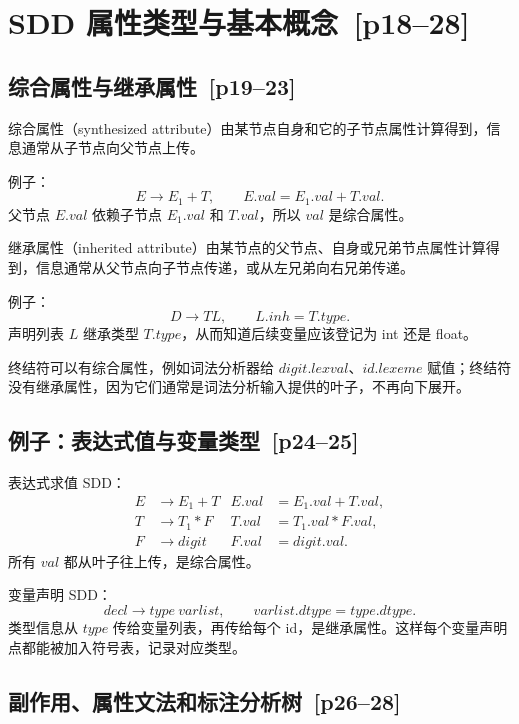 \documentclass[UTF8,fontset=none,11pt]{ctexart}
\newenvironment{defbox}[1][]{%
  \par\medskip\noindent{\color{defrule}\rule{\linewidth}{1.1pt}}\par\nopagebreak
  \noindent{\bfseries\color{defrule}#1}\par\nopagebreak\smallskip}%
  {\par\nopagebreak\smallskip\noindent{\color{defrule}\rule{\linewidth}{0.4pt}}\par\medskip}
\newcommand{\pg}[1]{\texorpdfstring{{\small\color{graytext}\,[p#1]}}{ [p#1]}}
\begin{document}
\section{SDD 属性类型与基本概念 \pg{18--28}}

\subsection{综合属性与继承属性 \pg{19--23}}

\begin{defbox}[综合属性]
综合属性（synthesized attribute）由某节点自身和它的子节点属性计算得到，信息通常从子节点向父节点上传。
\end{defbox}

例子：
\[
E\to E_1+T,\qquad E.val=E_1.val+T.val.
\]
父节点 \(E.val\) 依赖子节点 \(E_1.val\) 和 \(T.val\)，所以 \(val\) 是综合属性。

\begin{defbox}[继承属性]
继承属性（inherited attribute）由某节点的父节点、自身或兄弟节点属性计算得到，信息通常从父节点向子节点传递，或从左兄弟向右兄弟传递。
\end{defbox}

例子：
\[
D\to T L,\qquad L.inh=T.type.
\]
声明列表 \(L\) 继承类型 \(T.type\)，从而知道后续变量应该登记为 int 还是 float。

终结符可以有综合属性，例如词法分析器给 \(digit.lexval\)、\(id.lexeme\) 赋值；终结符没有继承属性，因为它们通常是词法分析输入提供的叶子，不再向下展开。

\subsection{例子：表达式值与变量类型 \pg{24--25}}

表达式求值 SDD：
\[
\begin{aligned}
E&\to E_1+T & E.val&=E_1.val+T.val,\\
T&\to T_1*F & T.val&=T_1.val*F.val,\\
F&\to digit & F.val&=digit.val.
\end{aligned}
\]
所有 \(val\) 都从叶子往上传，是综合属性。

变量声明 SDD：
\[
decl\to type\ varlist,\qquad varlist.dtype=type.dtype.
\]
类型信息从 \(type\) 传给变量列表，再传给每个 id，是继承属性。这样每个变量声明点都能被加入符号表，记录对应类型。

\subsection{副作用、属性文法和标注分析树 \pg{26--28}}
\end{document}
